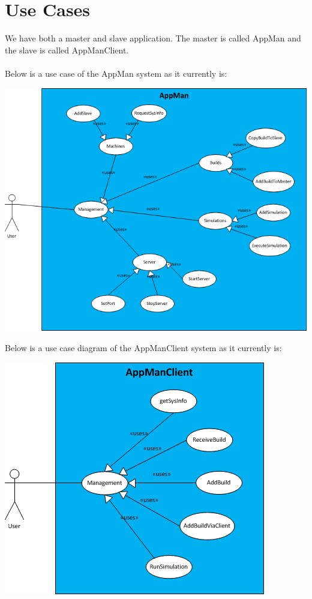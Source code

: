 \documentclass[a4paper,12pt,final]{article}
\begin{document}
\newpage
\section{Use Cases}
We have both a master and slave application. The master is called AppMan and the slave is called AppManClient.\\
\textbf{\\}
Below is a use case of the AppMan system as it currently is:\\
\begin{center}
\includegraphics[scale=0.8]{AppManUseCase.png}
\end{center}
Below is a use case diagram of the AppManClient system as it currently is:\\
\begin{center}
\includegraphics[scale=0.7]{AppManClientUseCase.png}
\end{center}
\end{document}
